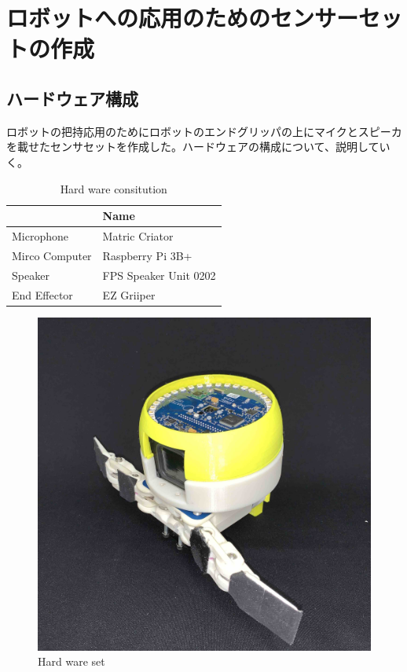 \section{ロボットへの応用のためのセンサーセットの作成}
\label{chap:app_hand}

\subsection{ハードウェア構成}
\label{sec:hard_content}
ロボットの把持応用のためにロボットのエンドグリッパの上にマイクとスピーカを載せたセンサセットを作成した。ハードウェアの構成について、説明していく。

\begin{table}[h]
    \centering
    \caption{Hard ware consitution}
    \vspace{1zh}
    \begin{tabular}{l||l} \hline
         & Name \\ \hline\hline
        Microphone & Matric Criator \\
        Mirco Computer & Raspberry Pi 3B+ \\
        Speaker & FPS Speaker Unit 0202 \\
        End Effector & EZ Griiper \\ \hline
    \end{tabular}
    \label{tab:hand_hard_content}
\end{table}

\begin{figure}[hb]
  \begin{center}
  \vspace{1zh}
    \includegraphics[width=\linewidth]{images/5_sensor_st.jpg}   
  \end{center}
  \caption{Hard ware set}
  \label{fig:hand_hard_image}
\end{figure}

